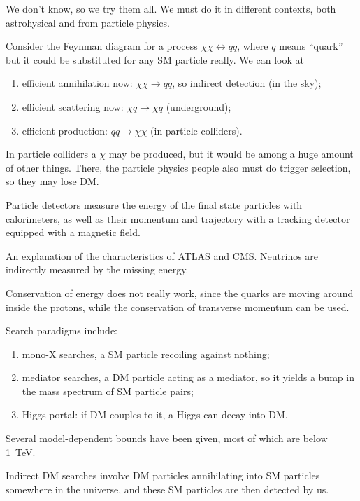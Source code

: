\documentclass[main.tex]{subfiles}
\begin{document}
We don't know, so we try them all. 
We must do it in different contexts, both astrohysical and from particle physics. 

Consider the Feynman diagram for a process \(\chi \chi \leftrightarrow q q \), where \(q\) means ``quark'' but it could be substituted for any SM particle really. 
We can look at 
\begin{enumerate}
    \item efficient annihilation now: \(\chi \chi \to q q\), so indirect detection (in the sky);
    \item efficient scattering now: \(\chi q \to \chi q\) (underground);
    \item efficient production: \(q q \to \chi \chi \) (in particle colliders).
\end{enumerate}

In particle colliders a \(\chi \) may be produced, but it would be among a huge amount of other things. 
There, the particle physics people also must do trigger selection, so they may lose DM. 

Particle detectors measure the energy of the final state particles with calorimeters, as well as their momentum and trajectory with a tracking detector equipped with a magnetic field. 

An explanation of the characteristics of ATLAS and CMS.
Neutrinos are indirectly measured by the missing energy. 


Conservation of energy does not really work, since the quarks are moving around inside the protons, while the conservation of transverse momentum can be used. 

Search paradigms include: 
\begin{enumerate}
    \item mono-X searches, a SM particle recoiling against nothing;
    \item mediator searches, a DM particle acting as a mediator, so it yields a bump in the mass spectrum of SM particle pairs;
    \item Higgs portal: if DM couples to it, a Higgs can decay into DM. 
\end{enumerate}

Several model-dependent bounds have been given, most of which are below \SI{1}{TeV}. 

Indirect DM searches involve DM particles annihilating into SM particles somewhere in the universe, and these SM particles are then detected by us.  
\end{document}
